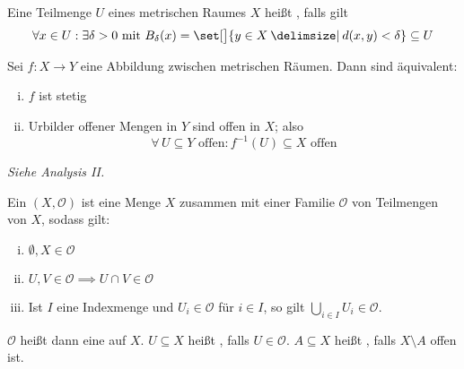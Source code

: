 \begin{definition}[{name=[Offene Mengen in metrischen Räumen]},label=def:offen-metrisch]
	Eine Teilmenge $U$ eines metrischen Raumes $X$ heißt , falls gilt 
	\[
		\forall x \in U : \exists \delta  > 0 \text{ mit } B_\delta (x) = \set[\big]{y \in X \given d(x,y) < \delta } \subseteq U   
	\]
\end{definition}

\begin{lemma}[{name=[Charakterisierung von Stetigkeit über offene Mengen]}]
	Sei $f \colon X \to Y$  eine Abbildung zwischen metrischen Räumen. Dann sind äquivalent:
	\begin{enumerate}[(i)]
		\item $f$ ist stetig
		\item Urbilder offener Mengen in $Y$ sind offen in $X$; also 
		\[
			\forall \, U \subseteq Y \text{ offen} : f^{-1}(U) \subseteq X \text{ offen}
		\]
	\end{enumerate}
\end{lemma}
\begin{beweis}
	\emph{Siehe Analysis II.}
\end{beweis}

\begin{definition}[{name=[topologischer Raum]}]
	Ein  $(X, \mathcal{O})$ ist eine Menge $X$ zusammen mit einer Familie $\mathcal{O}$ von Teilmengen von $X$, sodass gilt:
	\begin{enumerate}[(i)]
		\item $\emptyset, X \in \mathcal{O}$
		\item $U,V \in \mathcal{O} \implies U \cap V \in \mathcal{O}$
		\item Ist $I$ eine Indexmenge und $U_i \in \mathcal{O}$ für $i \in I$, so gilt $\bigcup_{i \in I} U_i \in \mathcal{O}$.
	\end{enumerate} 
	$\mathcal{O}$ heißt dann eine  auf $X$. 
	$U \subseteq X$ heißt , falls $U \in \mathcal{O}$. 
	$A \subseteq X$ heißt , falls $X \setminus A$ offen ist.
\end{definition}

